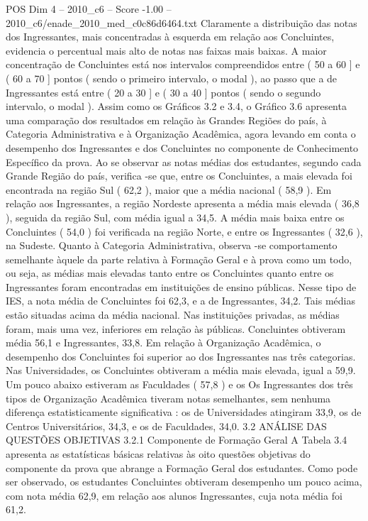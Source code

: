\begin{textsample}{POS Dim 4 – 2010\_c6 – Score -1.00 – 2010\_c6/enade\_2010\_med\_c0c86d6464.txt}
Claramente a distribuição das notas dos Ingressantes, mais concentradas à esquerda em relação aos Concluintes, evidencia o percentual mais alto de notas nas faixas mais baixas.
A maior concentração de Concluintes está nos intervalos compreendidos entre ( 50 a 60 ] e ( 60 a 70 ] pontos ( sendo o primeiro intervalo, o modal ), ao passo que a de Ingressantes está entre ( 20 a 30 ] e ( 30 a 40 ] pontos ( sendo o segundo intervalo, o modal ).
Assim como os Gráficos 3.2 e 3.4, o Gráfico 3.6 apresenta uma comparação dos resultados em relação às Grandes Regiões do país, à Categoria Administrativa e à Organização Acadêmica, agora levando em conta o desempenho dos Ingressantes e dos Concluintes no componente de Conhecimento Específico da prova.
Ao se observar as notas médias dos estudantes, segundo cada Grande Região do país, verifica -se que, entre os Concluintes, a mais elevada foi encontrada na região Sul ( 62,2 ), maior que a média nacional ( 58,9 ).
Em relação aos Ingressantes, a região Nordeste apresenta a média mais elevada ( 36,8 ), seguida da região Sul, com média igual a 34,5.
A média mais baixa entre os Concluintes ( 54,0 ) foi verificada na região Norte, e entre os Ingressantes ( 32,6 ), na Sudeste.
Quanto à Categoria Administrativa, observa -se comportamento semelhante àquele da parte relativa à Formação Geral e à prova como um todo, ou seja, as médias mais elevadas tanto entre os Concluintes quanto entre os Ingressantes foram encontradas em instituições de ensino públicas.
Nesse tipo de IES, a nota média de Concluintes foi 62,3, e a de Ingressantes, 34,2.
Tais médias estão situadas acima da média nacional.
Nas instituições privadas, as médias foram, mais uma vez, inferiores em relação às públicas.
Concluintes obtiveram média 56,1 e Ingressantes, 33,8.
Em relação à Organização Acadêmica, o desempenho dos Concluintes foi superior ao dos Ingressantes nas três categorias.
Nas Universidades, os Concluintes obtiveram a média mais elevada, igual a 59,9.
Um pouco abaixo estiveram as Faculdades ( 57,8 ) e os Os Ingressantes dos três tipos de Organização Acadêmica tiveram notas semelhantes, sem nenhuma diferença estatisticamente significativa : os de Universidades atingiram 33,9, os de Centros Universitários, 34,3, e os de Faculdades, 34,0. 3.2 ANÁLISE DAS QUESTÕES OBJETIVAS 3.2.1 Componente de Formação Geral A Tabela 3.4 apresenta as estatísticas básicas relativas às oito questões objetivas do componente da prova que abrange a Formação Geral dos estudantes.
Como pode ser observado, os estudantes Concluintes obtiveram desempenho um pouco acima, com nota média 62,9, em relação aos alunos Ingressantes, cuja nota média foi 61,2.

\end{textsample}

